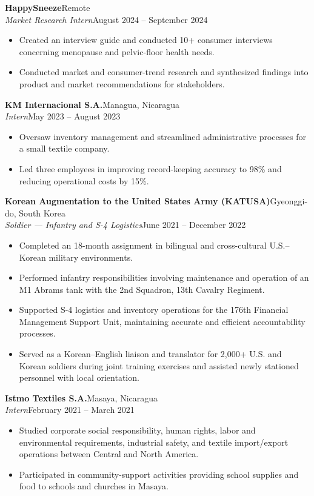 \documentclass[a4paper]{article}
\newcommand{\role}[4]{
    \Needspace{8\baselineskip}
    \vspace{2pt}
    \textbf{#1}\hfill #2\\
    \textit{#3}\hfill #4\\[-3pt]
}
\begin{document}
\role{HappySneeze}{Remote}
{Market Research Intern}{August 2024 -- September 2024}
\begin{itemize}[noitemsep]
  \item Created an interview guide and conducted 10+ consumer interviews concerning menopause and pelvic-floor health needs.
  \item Conducted market and consumer-trend research and synthesized findings into product and market recommendations for stakeholders.
\end{itemize}

\role{KM Internacional S.A.}{Managua, Nicaragua}
{Intern}{May 2023 -- August 2023}
\begin{itemize}[noitemsep]
  \item Oversaw inventory management and streamlined administrative processes for a small textile company.
  \item Led three employees in improving record-keeping accuracy to 98\% and reducing operational costs by 15\%.
\end{itemize}

\role{Korean Augmentation to the United States Army (KATUSA)}{Gyeonggi-do, South Korea}
{Soldier --- Infantry and S-4 Logistics}{June 2021 -- December 2022}
\begin{itemize}[noitemsep]
  \item Completed an 18-month assignment in bilingual and cross-cultural U.S.--Korean military environments.
  \item Performed infantry responsibilities involving maintenance and operation of an M1 Abrams tank with the 2nd Squadron, 13th Cavalry Regiment.
  \item Supported S-4 logistics and inventory operations for the 176th Financial Management Support Unit, maintaining accurate and efficient accountability processes.
  \item Served as a Korean--English liaison and translator for 2,000+ U.S. and Korean soldiers during joint training exercises and assisted newly stationed personnel with local orientation.
\end{itemize}

\role{Istmo Textiles S.A.}{Masaya, Nicaragua}
{Intern}{February 2021 -- March 2021}
\begin{itemize}[noitemsep]
  \item Studied corporate social responsibility, human rights, labor and environmental requirements, industrial safety, and textile import/export operations between Central and North America.
  \item Participated in community-support activities providing school supplies and food to schools and churches in Masaya.
\end{itemize}
\end{document}
